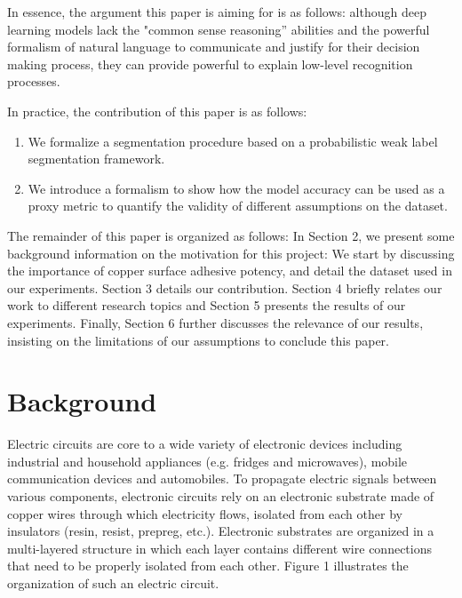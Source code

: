 \documentclass[10pt,twocolumn,letterpaper]{article}
\begin{document}
In essence, the argument this paper is aiming for is as follows: although deep learning models 
lack the "common sense reasoning” abilities and the powerful formalism of natural language to communicate 
and justify for their decision making process, they can provide powerful to explain low-level recognition processes.

In practice, the contribution of this paper is as follows:
\begin{enumerate}
\item  We formalize a segmentation procedure based on a probabilistic weak label segmentation framework.
\item  We introduce a formalism to show how the model accuracy can be used as a proxy metric to quantify the validity of different assumptions
on the dataset.
\end{enumerate}

The remainder of this paper is organized as follows:
In Section 2, we present some background information on the motivation for this project:
We start by discussing the importance of copper surface adhesive potency,
and detail the dataset used in our experiments. 
Section 3 details our contribution.
Section 4 briefly relates our work to different research topics and Section 5 presents the results of our experiments.
Finally, Section 6 further discusses the relevance of our results, insisting on the limitations of our assumptions to conclude this paper.

\section{Background}

Electric circuits are core to a wide variety of electronic devices including industrial and household appliances (e.g. fridges and microwaves), mobile communication devices and automobiles.
To propagate electric signals between various components, electronic circuits rely on an electronic substrate  made of copper wires through which electricity flows, isolated from each other by insulators (resin, resist, prepreg, etc.).
Electronic substrates are organized in a multi-layered structure in which each layer contains different wire connections that need to be properly isolated from each other. Figure 1 illustrates the organization of such an electric circuit.
\end{document}
